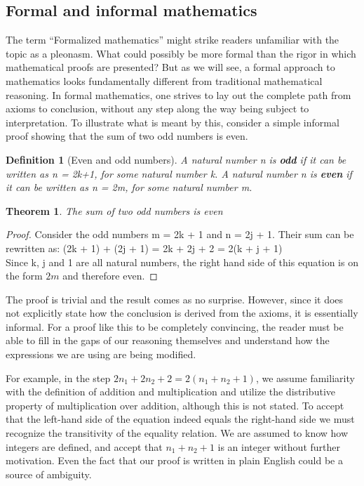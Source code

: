 \documentclass[11pt,a4paper]{article}
\begin{document}
\subsection{Formal and informal mathematics}\label{subsec: formal & informal}
The term ``Formalized mathematics'' might strike readers unfamiliar with the topic as a pleonasm. What could possibly be more formal than the rigor in which mathematical proofs are presented? But as we will see, a formal approach to mathematics looks fundamentally different from traditional mathematical reasoning. In formal mathematics, one strives to lay out the complete path from axioms to conclusion, without any step along the way being subject to interpretation. To illustrate what is meant by this, consider a simple informal proof showing that the sum of two odd numbers is even.
\newtheorem{definition}{Definition}[section]
\newtheorem{theorem}{Theorem}[section]
\theoremstyle{definition}
\begin{definition}[Even and odd numbers]
A natural number n is \textbf{odd} if it can be written as n = 2k+1, for some natural number k.
A natural number n is \textbf{even} if it can be written as n = 2m, for some natural number m.\\
\end{definition}
\begin{theorem}
  The sum of two odd numbers is even
 \end{theorem}
\begin{proof} Consider the odd numbers m = 2k + 1 and n = 2j + 1. Their sum can be rewritten as: (2k + 1) + (2j + 1) = 2k + 2j + 2 = 2(k + j + 1)\\
Since k, j and 1 are all natural numbers, the right hand side of this equation is on the form $2m$ and therefore even.
\end{proof}

The proof is trivial and the result comes as no surprise. However, since it does not explicitly state how the conclusion is derived from the axioms, it is essentially informal. For a proof like this to be completely convincing, the reader must be able to fill in the gaps of our reasoning themselves and understand how the expressions we are using are being modified.

For example, in the step $2n_1+2n_2+2 = 2(n_1+n_2+1)$, we assume familiarity with the definition of addition and multiplication and utilize the distributive property of multiplication over addition, although this is not stated. To accept that the left-hand side of the equation indeed equals the right-hand side we must recognize the transitivity of the equality relation. We are assumed to know how integers are defined, and accept that $n_1+n_2+1$ is an integer without further motivation. Even the fact that our proof is written in plain English could be a source of ambiguity.\\
\end{document}
